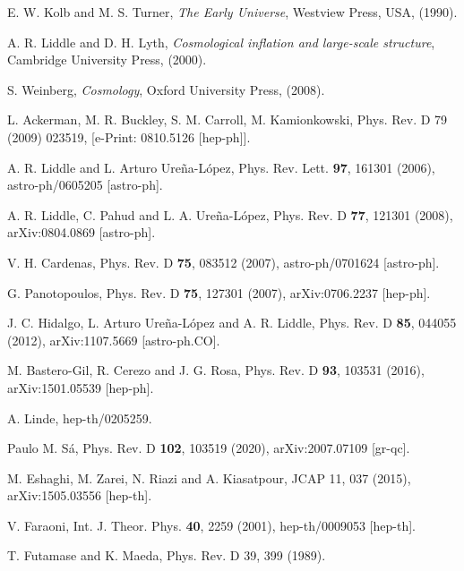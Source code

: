\documentclass[preprintnumbers,amsmath,amssymb,nofootinbib]{revtex4}
\begin{document}
\begin{thebibliography}{99}



 E. W. Kolb and M. S. Turner, {\it The Early Universe}, Westview Press, USA, (1990).

A. R. Liddle and D. H. Lyth, \emph{Cosmological inflation and large-scale structure}, Cambridge University Press, (2000).

 S. Weinberg, \emph{Cosmology},
Oxford University Press, (2008).

 L. Ackerman, M. R. Buckley, S. M. Carroll, M. Kamionkowski, Phys. Rev. D 79 (2009) 023519, [e-Print: 0810.5126 [hep-ph]].

 A. R. Liddle and L. Arturo Ure\~na-L\'opez, Phys. Rev. Lett. {\bf 97}, 161301 (2006), astro-ph/0605205 [astro-ph].

 A. R. Liddle, C. Pahud and L. A. Ure\~na-L\'opez, Phys. Rev. D {\bf 77}, 121301 (2008), arXiv:0804.0869 [astro-ph].

 V. H. Cardenas, Phys. Rev. D {\bf 75}, 083512 (2007), astro-ph/0701624 [astro-ph].

 G. Panotopoulos, Phys. Rev. D {\bf 75}, 127301 (2007), arXiv:0706.2237 [hep-ph].



 J. C. Hidalgo, L. Arturo Ure\~na-L\'opez and A. R. Liddle, Phys. Rev. D {\bf 85}, 044055 (2012), arXiv:1107.5669 [astro-ph.CO].

 M. Bastero-Gil, R. Cerezo and J. G. Rosa, Phys. Rev. D {\bf 93}, 103531 (2016), arXiv:1501.05539 [hep-ph].

A. Linde, hep-th/0205259.

Paulo M. Sá, Phys. Rev. D {\bf 102}, 103519 (2020), arXiv:2007.07109 [gr-qc].

 M. Eshaghi, M. Zarei, N. Riazi and A. Kiasatpour,
JCAP 11, 037 (2015), arXiv:1505.03556 [hep-th].


 V. Faraoni, Int. J. Theor. Phys. {\bf 40}, 2259 (2001), hep-th/0009053 [hep-th].




 T. Futamase and K. Maeda, Phys. Rev. D 39, 399 (1989).


\end{thebibliography}
\end{document}
